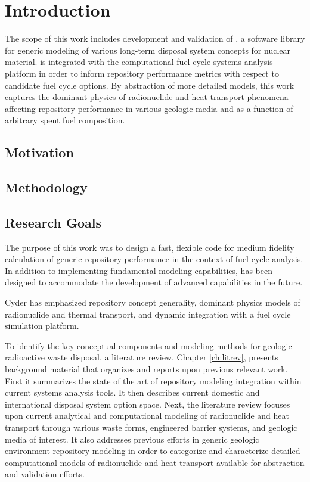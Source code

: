 \chapter{Introduction}\label{ch:introduction}


The scope of this work includes development and validation of \Cyder, a software 
library for generic modeling of various long-term disposal system concepts for 
nuclear material. \Cyder is integrated with the \Cyclus computational fuel cycle 
systems analysis platform in order to inform repository performance metrics with 
respect to candidate fuel cycle options.  By abstraction of more detailed 
models, this work captures the dominant physics of radionuclide and heat 
transport phenomena affecting repository performance in various geologic media 
and as a function of arbitrary spent fuel composition. 

\section{Motivation} 


\section{Methodology} 


\section{Research Goals}

The purpose of this work was to design a fast, flexible code for medium fidelity 
calculation of generic repository performance in the context of fuel cycle 
analysis. In addition to implementing fundamental modeling capabilities, \Cyder 
has been designed to accommodate the development of advanced capabilities in the 
future.

Cyder has emphasized repository concept generality, dominant physics models of 
radionuclide and thermal transport, and dynamic integration with a fuel cycle 
simulation platform.


To identify the key conceptual components and modeling methods for geologic 
radioactive waste disposal, a literature review, Chapter \ref{ch:litrev}, 
presents background material that organizes and reports upon previous relevant 
work. First it summarizes the state of the art of repository modeling 
integration within current systems analysis tools. It then describes current 
domestic and international disposal system option space.  Next, the literature 
review focuses upon current analytical and computational modeling of 
radionuclide and heat transport through various waste forms, engineered barrier 
systems, and geologic media of interest.  It also addresses previous efforts in 
generic geologic environment repository modeling in order to categorize and 
characterize detailed computational models of radionuclide and heat transport 
available for abstraction and validation efforts.

